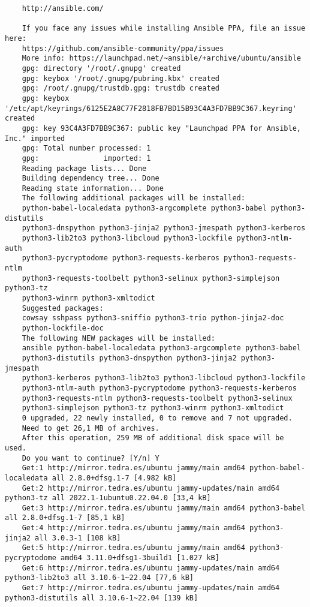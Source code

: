 \documentclass[../main.tex]{subfiles}
\begin{document}
\begin{lstlisting}
	http://ansible.com/
	
	If you face any issues while installing Ansible PPA, file an issue here:
	https://github.com/ansible-community/ppa/issues
	More info: https://launchpad.net/~ansible/+archive/ubuntu/ansible
	gpg: directory '/root/.gnupg' created
	gpg: keybox '/root/.gnupg/pubring.kbx' created
	gpg: /root/.gnupg/trustdb.gpg: trustdb created
	gpg: keybox '/etc/apt/keyrings/6125E2A8C77F2818FB7BD15B93C4A3FD7BB9C367.keyring' created
	gpg: key 93C4A3FD7BB9C367: public key "Launchpad PPA for Ansible, Inc." imported
	gpg: Total number processed: 1
	gpg:               imported: 1
	Reading package lists... Done
	Building dependency tree... Done
	Reading state information... Done
	The following additional packages will be installed:
	python-babel-localedata python3-argcomplete python3-babel python3-distutils
	python3-dnspython python3-jinja2 python3-jmespath python3-kerberos
	python3-lib2to3 python3-libcloud python3-lockfile python3-ntlm-auth
	python3-pycryptodome python3-requests-kerberos python3-requests-ntlm
	python3-requests-toolbelt python3-selinux python3-simplejson python3-tz
	python3-winrm python3-xmltodict
	Suggested packages:
	cowsay sshpass python3-sniffio python3-trio python-jinja2-doc
	python-lockfile-doc
	The following NEW packages will be installed:
	ansible python-babel-localedata python3-argcomplete python3-babel
	python3-distutils python3-dnspython python3-jinja2 python3-jmespath
	python3-kerberos python3-lib2to3 python3-libcloud python3-lockfile
	python3-ntlm-auth python3-pycryptodome python3-requests-kerberos
	python3-requests-ntlm python3-requests-toolbelt python3-selinux
	python3-simplejson python3-tz python3-winrm python3-xmltodict
	0 upgraded, 22 newly installed, 0 to remove and 7 not upgraded.
	Need to get 26,1 MB of archives.
	After this operation, 259 MB of additional disk space will be used.
	Do you want to continue? [Y/n] Y
	Get:1 http://mirror.tedra.es/ubuntu jammy/main amd64 python-babel-localedata all 2.8.0+dfsg.1-7 [4.982 kB]
	Get:2 http://mirror.tedra.es/ubuntu jammy-updates/main amd64 python3-tz all 2022.1-1ubuntu0.22.04.0 [33,4 kB]
	Get:3 http://mirror.tedra.es/ubuntu jammy/main amd64 python3-babel all 2.8.0+dfsg.1-7 [85,1 kB]
	Get:4 http://mirror.tedra.es/ubuntu jammy/main amd64 python3-jinja2 all 3.0.3-1 [108 kB]
	Get:5 http://mirror.tedra.es/ubuntu jammy/main amd64 python3-pycryptodome amd64 3.11.0+dfsg1-3build1 [1.027 kB]
	Get:6 http://mirror.tedra.es/ubuntu jammy-updates/main amd64 python3-lib2to3 all 3.10.6-1~22.04 [77,6 kB]
	Get:7 http://mirror.tedra.es/ubuntu jammy-updates/main amd64 python3-distutils all 3.10.6-1~22.04 [139 kB]

\end{lstlisting}
\end{document}
